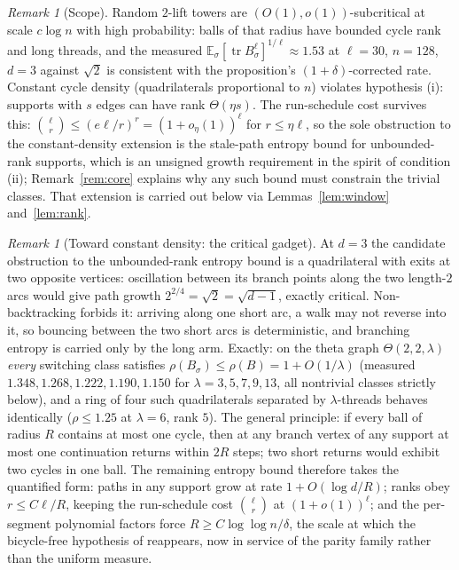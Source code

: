 \documentclass[11pt]{article}
\theoremstyle{remark}
\newtheorem{remark}[lemma]{Remark}
\DeclareMathOperator{\tr}{tr}
\begin{document}
\begin{remark}[Scope]\label{rem:scope}
Random $2$-lift towers are $(O(1),o(1))$-subcritical at scale
$c\log n$ with high probability: balls of that radius have bounded
cycle rank and long threads, and the measured
$\mathbb E_\sigma[\tr B_\sigma^{\ell}]^{1/\ell}\approx1.53$ at
$\ell=30$, $n=128$, $d=3$ against $\sqrt2$ is consistent with the
proposition's $(1+\delta)$-corrected rate. Constant cycle density
(quadrilaterals proportional to $n$) violates hypothesis (i): supports
with $s$ edges can have rank $\Theta(\eta s)$. The run-schedule cost
survives this: $\binom{\ell}{r}\le(e\ell/r)^{r}=(1+o_\eta(1))^{\ell}$
for $r\le\eta\ell$, so the sole obstruction to the constant-density
extension is the stale-path entropy bound for unbounded-rank supports,
which is an unsigned growth requirement in the spirit of condition
(ii); Remark~\ref{rem:core} explains why any such bound must
constrain the trivial classes. That extension is carried out below via
Lemmas~\ref{lem:window} and~\ref{lem:rank}.
\end{remark}

\begin{remark}[Toward constant density: the critical gadget]\label{rem:gadget}
At $d=3$ the candidate obstruction to the unbounded-rank entropy bound
is a quadrilateral with exits at two opposite vertices: oscillation
between its branch points along the two length-$2$ arcs would give
path growth $2^{2/4}=\sqrt2=\sqrt{d-1}$, exactly critical.
Non-backtracking forbids it: arriving along one short arc, a walk may
not reverse into it, so bouncing between the two short arcs is
deterministic, and branching entropy is carried only by the long arm.
Exactly: on the theta graph $\Theta(2,2,\lambda)$ \emph{every}
switching class satisfies $\rho(B_\sigma)\le\rho(B)=1+O(1/\lambda)$
(measured $1.348, 1.268, 1.222, 1.190, 1.150$ for
$\lambda=3,5,7,9,13$, all nontrivial classes strictly below), and a
ring of four such quadrilaterals separated by $\lambda$-threads
behaves identically ($\rho\le1.25$ at $\lambda=6$, rank $5$). The
general principle: if every ball of radius $R$ contains at most one
cycle, then at any branch vertex of any support at most one
continuation returns within $2R$ steps; two short returns would
exhibit two cycles in one ball. The remaining entropy bound therefore
takes the quantified form: paths in any support grow at rate
$1+O(\log d/R)$; ranks obey $r\le C\ell/R$, keeping the run-schedule
cost $\binom{\ell}{r}$ at $(1+o(1))^{\ell}$; and the per-segment
polynomial factors force $R\ge C\log\log n/\delta$, the scale at
which the bicycle-free hypothesis of \cite{mop20} reappears, now in
service of the parity family rather than the uniform measure.
\end{remark}
\end{document}
